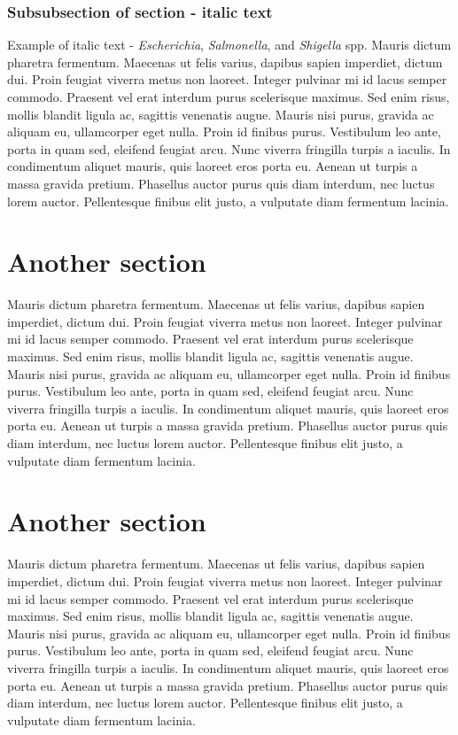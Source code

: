 \subsubsection{Subsubsection of section - italic text}
Example of italic text - {\it Escherichia}, {\it Salmonella}, and {\it Shigella} spp. Mauris dictum pharetra fermentum. Maecenas ut felis varius, dapibus sapien imperdiet, dictum dui. Proin feugiat viverra metus non laoreet. Integer pulvinar mi id lacus semper commodo. Praesent vel erat interdum purus scelerisque maximus. Sed enim risus, mollis blandit ligula ac, sagittis venenatis augue. Mauris nisi purus, gravida ac aliquam eu, ullamcorper eget nulla. Proin id finibus purus. Vestibulum leo ante, porta in quam sed, eleifend feugiat arcu. Nunc viverra fringilla turpis a iaculis. In condimentum aliquet mauris, quis laoreet eros porta eu. Aenean ut turpis a massa gravida pretium. Phasellus auctor purus quis diam interdum, nec luctus lorem auctor. Pellentesque finibus elit justo, a vulputate diam fermentum lacinia. 
\section{Another section}
Mauris dictum pharetra fermentum. Maecenas ut felis varius, dapibus sapien imperdiet, dictum dui. Proin feugiat viverra metus non laoreet. Integer pulvinar mi id lacus semper commodo. Praesent vel erat interdum purus scelerisque maximus. Sed enim risus, mollis blandit ligula ac, sagittis venenatis augue. Mauris nisi purus, gravida ac aliquam eu, ullamcorper eget nulla. Proin id finibus purus. Vestibulum leo ante, porta in quam sed, eleifend feugiat arcu. Nunc viverra fringilla turpis a iaculis. In condimentum aliquet mauris, quis laoreet eros porta eu. Aenean ut turpis a massa gravida pretium. Phasellus auctor purus quis diam interdum, nec luctus lorem auctor. Pellentesque finibus elit justo, a vulputate diam fermentum lacinia. 
\section{Another section}
Mauris dictum pharetra fermentum. Maecenas ut felis varius, dapibus sapien imperdiet, dictum dui. Proin feugiat viverra metus non laoreet. Integer pulvinar mi id lacus semper commodo. Praesent vel erat interdum purus scelerisque maximus. Sed enim risus, mollis blandit ligula ac, sagittis venenatis augue. Mauris nisi purus, gravida ac aliquam eu, ullamcorper eget nulla. Proin id finibus purus. Vestibulum leo ante, porta in quam sed, eleifend feugiat arcu. Nunc viverra fringilla turpis a iaculis. In condimentum aliquet mauris, quis laoreet eros porta eu. Aenean ut turpis a massa gravida pretium. Phasellus auctor purus quis diam interdum, nec luctus lorem auctor. Pellentesque finibus elit justo, a vulputate diam fermentum lacinia. 


